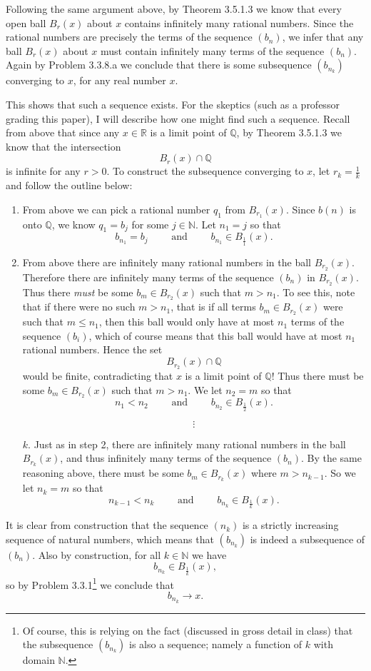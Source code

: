 \documentclass[12pt]{article}
\newcommand{\spand}{\qquad\text{ and }\qquad}
\newcommand{\R}{\mathbb R} %
\newcommand{\N}{\mathbb N} %
\newcommand{\Q}{\mathbb Q} %
\begin{document}
Following the same argument above, by Theorem 3.5.1.3 we know that every open ball $B_r(x)$ about $x$ contains infinitely many rational numbers. Since the rational numbers are precisely the terms of the sequence $(b_n)$, we infer that any ball $B_r(x)$ about $x$ must contain infinitely many terms of the sequence $(b_n)$. Again by Problem 3.3.8.a we conclude that there is some subsequence $(b_{n_k})$ converging to $x$, for any real number $x$.

This shows that such a sequence exists. For the skeptics (such as a professor grading this paper), I will describe how one might find such a sequence. Recall from above that since any $x\in\R$ is a limit point of $\Q$, by Theorem 3.5.1.3 we know that the intersection $$B_r(x) \cap \Q$$ is infinite for any $r>0$. %
To construct the subsequence converging to $x$, let $r_k=\frac{1}{k}$ and follow the outline below:
\begin{enumerate}
\item From above we can pick a rational number $q_1$ from $B_{r_1}(x)$. Since $b(n)$ is onto $\Q$, we know $q_1=b_j$ for some $j\in\N$. Let $n_1=j$ so that $$b_{n_1} = b_j \spand b_{n_1} \in B_{\frac{1}{1}}(x).$$

\item From above there are infinitely many rational numbers in the ball $B_{r_2}(x)$. Therefore there are infinitely many terms of the sequence $(b_n)$ in $B_{r_2}(x)$. Thus there {\em must} be some $b_m\in B_{r_2}(x)$ such that $m>n_1.$ To see this, note that if there were no such $m>n_1$, that is if all terms $b_m \in B_{r_2}(x)$ were such that $m\le n_1$, then this ball would only have at most $n_1$ terms of the sequence $(b_i)$, which of course means that this ball would have at most $n_1$ rational numbers. Hence the set $$B_{r_2}(x) \cap \Q$$ would be finite, contradicting that $x$ is a limit point of $\Q$! Thus there must be some $b_m\in B_{r_2}(x)$ such that $m>n_1$. We let $n_2=m$ so that $$n_1< n_2 \spand b_{n_2}\in B_{\frac{1}{2}}(x).$$ 

$$\vdots$$


\item[$k$.] Just as in step 2, there are infinitely many rational numbers in the ball $B_{r_k}(x)$, and thus infinitely many terms of the sequence $(b_n)$. By the same reasoning above, there must be some $b_m\in B_{r_k}(x)$ where $m>n_{k-1}.$ So we let $n_k=m$ so that $$n_{k-1} < n_k \spand b_{n_k} \in B_{\frac{1}{k}}(x).$$ 
\end{enumerate}

It is clear from construction that the sequence $(n_k)$ is a strictly increasing sequence of natural numbers, which means that $(b_{n_k})$ is indeed a subsequence of $(b_n)$. Also by construction, for all $k\in\N$ we have $$b_{n_k} \in B_{\frac{1}{k}}(x),$$ so by Problem 3.3.1\footnote{Of course, this is relying on the fact (discussed in gross detail in class) that the subsequence $(b_{n_k})$ is also a sequence; namely a function of $k$ with domain $\N$.} we conclude that $$b_{n_k} \to x.$$
\end{document}
